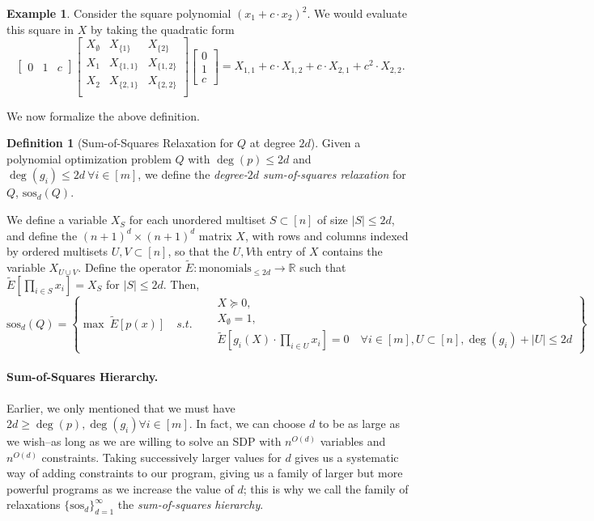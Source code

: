 \documentclass[a4paper,11pt]{article}
\newcommand{\R}{\mathbb{R}}
\newcommand{\sos}{\mathrm{sos}}
\theoremstyle{definition}
\newtheorem{example}{Example}
\newtheorem{definition}{Definition}
\begin{document}
\begin{example}
Consider the square polynomial $(x_1 + c \cdot x_2)^2$.
We would evaluate this square in $X$ by taking the quadratic form
\[
\begin{bmatrix}
0 & 1 & c
\end{bmatrix}
\begin{bmatrix}
 X_{\emptyset} & X_{\{1\}} & X_{\{2\}} \\
 X_{1} & X_{\{1,1\}} & X_{\{1,2\}} \\
 X_{2} & X_{\{2,1\}} & X_{\{2,2\}}\\
\end{bmatrix}
\begin{bmatrix}
0\\
1 \\
c
\end{bmatrix}
= X_{1,1} + c\cdot X_{1,2} + c\cdot X_{2,1} + c^2 \cdot X_{2,2}.
\]
\end{example}

\medskip
We now formalize the above definition.
\begin{definition}[Sum-of-Squares Relaxation for $Q$ at degree $2d$]
Given a polynomial optimization problem $Q$ with $\deg(p)\le 2d$ and $\deg(g_i) \le 2d\ \forall i \in [m]$, we define the {\em degree-$2d$ sum-of-squares relaxation} for $Q$, $\sos_{d}(Q)$.

We define a variable $X_{S}$ for each unordered multiset $S \subset [n]$ of size $|S| \le 2d$, and define the $(n+1)^d \times (n+1)^d$ matrix $X$, with rows and columns indexed by ordered multisets $U,V \subset [n]$, so that the $U,V$th entry of $X$ contains the variable $X_{U\cup V}$.
Define the operator $\tilde{E}:\text{monomials}_{\le 2d}\to \R$ such that $\tilde{E}[\prod_{i\in S} x_i] = X_S$ for $|S| \le 2d$.
Then,
\[
\sos_d(Q) =
\left\{
\max \ \tilde{E}[p(x)] \quad s.t.\quad
\begin{aligned}
&X \succeq 0,\\
&X_{\emptyset} = 1,\\
&\tilde{E}[ g_i(X)\cdot\prod_{i\in U} x_i] = 0\quad  \forall i \in [m], U \subset [n], \deg(g_i) + |U| \le 2d
\end{aligned}
\right\}
\]
\end{definition}

\paragraph{Sum-of-Squares Hierarchy.}
Earlier, we only mentioned that we must have $2d \ge \deg(p), \deg(g_i) \forall i \in [m]$.
In fact, we can choose $d$ to be as large as we wish--as long as we are willing to solve an SDP with $n^{O(d)}$ variables and $n^{O(d)}$ constraints.
Taking successively larger values for $d$ gives us a systematic way of adding constraints to our program, giving us a family of larger but more powerful programs as we increase the value of $d$; this is why we call the family of relaxations $\{\sos_d\}_{d = 1}^{\infty}$ the {\em sum-of-squares hierarchy}.
\end{document}
